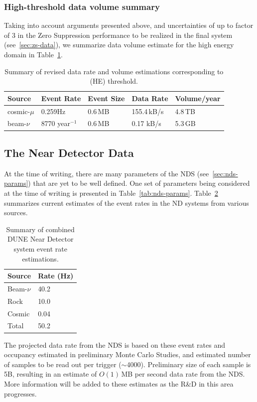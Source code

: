 \subsubsection{High-threshold data volume summary}
\label{sec:fd-data-volume-summary}
Taking into account arguments presented above, and uncertainties of up to factor of 3 in the Zero Suppression
performance to be realized in the final system (see~\ref{sec:zs-data}), we summarize data volume estimate for
the high energy domain in Table~\ref{tab:fd-data-volume-summary}.
\begin{table}[ht!]
\centering
\begin{tabular}{| p{1.2in} | p{0.95in} | p{0.75in} | p{1in} | p{0.9in} |}		\hline	
Source & Event Rate & Event Size & Data Rate & Volume/year \\ \hline
cosmic-$\mu$ & 0.259Hz & 0.6\,MB & 155.4\,kB/s & 4.8\,TB \\ \hline
beam-$\nu$ & 8770 year$^{-1}$ & 0.6\,MB & 0.17 kB/s & 5.3\,GB \\
\hline
\end{tabular}
\caption{Summary of revised data rate and volume estimations corresponding to (HE) threshold.}
\label{tab:fd-data-volume-summary}
\end{table}



\subsection{The Near Detector Data}
\label{sec:nds-event-rates}
At the time of writing, there are many parameters of the NDS (see~\ref{sec:nds-params})
that are yet to be well defined. One set of parameters being considered at the time of writing is presented in
Table~\ref{tab:nds-params}. Table~\ref{tab:nds-event-rates} summarizes current estimates of the event rates
in the ND systems from various sources.

\begin{table}[ht!]
\centering
\begin{tabular}{| p{0.8in} | p{0.8in} |}		\hline		
\textbf{Source} & \textbf{Rate} (Hz)\\ \hline
Beam-$\nu$ & 40.2 \\ \hline
Rock & 10.0 \\ \hline
Cosmic & 0.04 \\ \hline
Total & 50.2 \\ \hline
\end{tabular}
\caption{Summary of combined DUNE Near Detector system event rate estimations.}
\label{tab:nds-event-rates}
\end{table}
\noindent
The projected data rate from the NDS is based on these event rates and occupancy estimated in preliminary Monte Carlo Studies,
and estimated number of samples to be read out per trigger ($\sim$4000). Preliminary size of each sample is 5B, resulting in an estimate
of $O(1)$\,MB per second data rate from the NDS. More information will
be added to these estimates as the R\&D in this area progresses.
